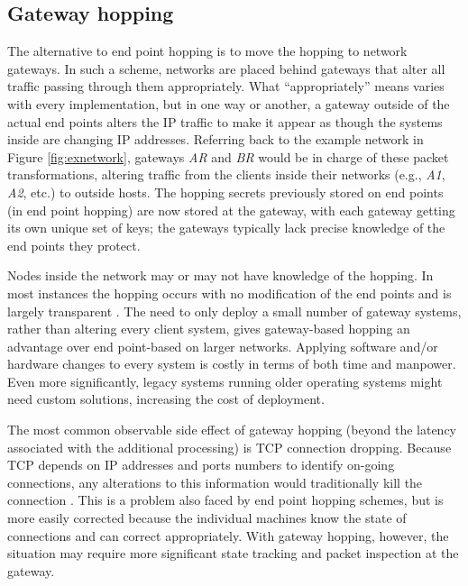 \subsection{Gateway hopping}
\label{sec:gateway_hopping}
\par The alternative to end point hopping is to move the hopping to network gateways. In such a scheme, networks are placed behind gateways that alter all traffic passing through them appropriately. What ``appropriately'' means varies with every implementation, but in one way or another, a gateway outside of the actual end points alters the IP traffic to make it appear as though the systems inside are changing IP addresses. Referring back to the example network in Figure \ref{fig:exnetwork}, gateways \textit{AR} and \textit{BR} would be in charge of these packet transformations, altering traffic from the clients inside their networks (e.g., \textit{A1}, \textit{A2}, etc.) to outside hosts. The hopping secrets previously stored on end points (in end point hopping) are now stored at the gateway, with each gateway getting its own unique set of keys; the gateways typically lack precise knowledge of the end points they protect.

\par Nodes inside the network may or may not have knowledge of the hopping. In most instances the hopping occurs with no modification of the end points and is largely transparent \cite{TAO}. The need to only deploy a small number of gateway systems, rather than altering every client system, gives gateway-based hopping an advantage over end point-based on larger networks. Applying software and/or hardware changes to every system is costly in terms of both time and manpower. Even more significantly, legacy systems running older operating systems might need custom solutions, increasing the cost of deployment.

\par The most common observable side effect of gateway hopping (beyond the latency associated with the additional processing) is \ac{TCP} connection dropping. Because TCP depends on IP addresses and ports numbers to identify on-going connections, any alterations to this information would traditionally kill the connection \cite{NASR}. This is a problem also faced by end point hopping schemes, but is more easily corrected because the individual machines know the state of connections and can correct appropriately. With gateway hopping, however, the situation may require more significant state tracking and packet inspection at the gateway.

